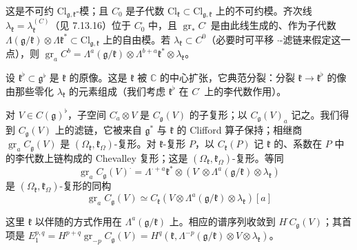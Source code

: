 这是不可约 $\mathrm{Cl}_{\mathfrak{g},\mathfrak{k}}$-模；且 $C^{\cdot}_{0}$ 是子代数 $\mathrm{Cl}_{\mathfrak{k}}\subset\mathrm{Cl}_{\mathfrak{g},\mathfrak{k}}$ 上的不可约模。齐次线 $\lambda_{\mathfrak{k}}=\lambda^{(C)}_{\mathfrak{k}}$（见 7.13.16）位于 $C^{\cdot}_{0}$ 中，且 $\operatorname{gr}_{*}C^{\cdot}$ 是由此线生成的、作为子代数 $\Lambda(\mathfrak{g}/\mathfrak{k})\otimes\Lambda\mathfrak{k}^{*}\subset\mathrm{Cl}_{\mathfrak{g},\mathfrak{k}}$ 上的自由模。若 $\lambda_{\mathfrak{k}}\subset C^{0}$（必要时可平移 $\cdot$-滤链来假定这一点），则 $\operatorname{gr}_{a}C^{b}=\Lambda^{a}(\mathfrak{g}/\mathfrak{k})\otimes\Lambda^{b+a}\mathfrak{k}^{*}\otimes\lambda_{\mathfrak{k}}$。

设 $\mathfrak{k}^{\flat}\subset\mathfrak{g}^{\flat}$ 是 $\mathfrak{k}$ 的原像。这是 $\mathfrak{k}$ 被 $\mathbb{C}$ 的中心扩张，它典范分裂：分裂 $\mathfrak{k}\to\mathfrak{k}^{\flat}$ 的像由那些零化 $\lambda_{\mathfrak{k}}$ 的元素组成（我们考虑 $\mathfrak{k}^{\flat}$ 在 $C^{\cdot}$ 上的李代数作用）。

对 $V\in C(\mathfrak{g})^{\flat}$，子空间 $C^{\cdot}_{a}\otimes V$ 是 $C_{\mathfrak{g}}(V)$ 的子复形；以 $C_{\mathfrak{g}}(V)_{a}$ 记之。我们得到 $C_{\mathfrak{g}}(V)$ 上的滤链，它被来自 $\mathfrak{g}^{*}$ 与 $\mathfrak{k}$ 的 Clifford 算子保持；相继商 $\operatorname{gr}_{a}C_{\mathfrak{g}}(V)$ 是 $(\Omega_{\mathfrak{k}},\mathfrak{k}_{\Omega})$-复形。对 $\mathfrak{k}$-复形 $P$，以 $C_{\mathfrak{k}}(P)$ 记 $\mathfrak{k}$ 的、系数在 $P$ 中的李代数上链构成的 Chevalley 复形；这是 $(\Omega_{\mathfrak{k}},\mathfrak{k}_{\Omega})$-复形。等同
\[
\operatorname{gr}_{a}C_{\mathfrak{g}}(V)^{\cdot}=\Lambda^{\cdot+a}\mathfrak{k}^{*}\otimes(V^{\cdot}\otimes\Lambda^{a}(\mathfrak{g}/\mathfrak{k})\otimes\lambda_{\mathfrak{k}})
\]
是 $(\Omega_{\mathfrak{k}},\mathfrak{k}_{\Omega})$-复形的同构
\begin{equation}\tag{376}
\operatorname{gr}_{a}C_{\mathfrak{g}}(V)\simeq C_{\mathfrak{k}}(V\otimes\Lambda^{a}(\mathfrak{g}/\mathfrak{k})\otimes\lambda_{\mathfrak{k}})[a]
\end{equation}

这里 $\mathfrak{k}$ 以伴随的方式作用在 $\Lambda^{a}(\mathfrak{g}/\mathfrak{k})$ 上。相应的谱序列收敛到 $H^{\cdot}C_{\mathfrak{g}}(V)$；其首项是 $E^{p,q}_{1}=H^{p+q}\operatorname{gr}_{-p}C_{\mathfrak{g}}(V)=H^{q}(\mathfrak{k},\Lambda^{-p}(\mathfrak{g}/\mathfrak{k})\otimes V\otimes\lambda_{\mathfrak{k}})$。

